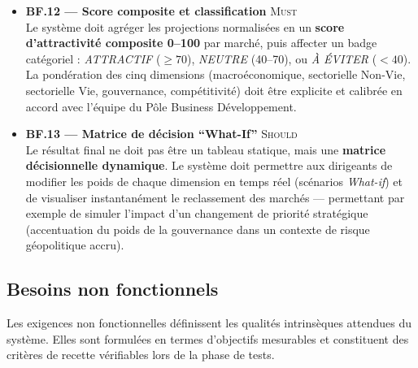 \documentclass[12pt,a4paper]{report}
\begin{document}
\begin{itemize}[leftmargin=1.5cm, itemsep=5pt]
  \item \textbf{BF.12 --- Score composite et classification} \hfill \textsc{Must} \\ Le système doit agréger les projections normalisées en un \textbf{score d'attractivité composite 0--100} par marché, puis affecter un badge catégoriel : \textit{ATTRACTIF} ($\ge 70$), \textit{NEUTRE} (40--70), ou \textit{À ÉVITER} ($< 40$). La pondération des cinq dimensions (macroéconomique, sectorielle Non-Vie, sectorielle Vie, gouvernance, compétitivité) doit être explicite et calibrée en accord avec l'équipe du Pôle Business Développement.

  \item \textbf{BF.13 --- Matrice de décision ``What-If''} \hfill \textsc{Should} \\ Le résultat final ne doit pas être un tableau statique, mais une \textbf{matrice décisionnelle dynamique}. Le système doit permettre aux dirigeants de modifier les poids de chaque dimension en temps réel (scénarios \textit{What-if}) et de visualiser instantanément le reclassement des marchés --- permettant par exemple de simuler l'impact d'un changement de priorité stratégique (accentuation du poids de la gouvernance dans un contexte de risque géopolitique accru).
\end{itemize}


\subsection{Besoins non fonctionnels}

Les exigences non fonctionnelles définissent les qualités intrinsèques attendues du système. Elles sont formulées en termes d'objectifs mesurables et constituent des critères de recette vérifiables lors de la phase de tests.
\end{document}
